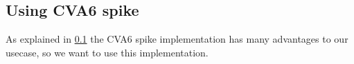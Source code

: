 %
%
%
%
%
%
%
%




%
%
%
%
%




\subsection{Using CVA6 spike}

As explained in \ref{} the CVA6 spike implementation has many advantages to our usecase, so we want to use this implementation.

